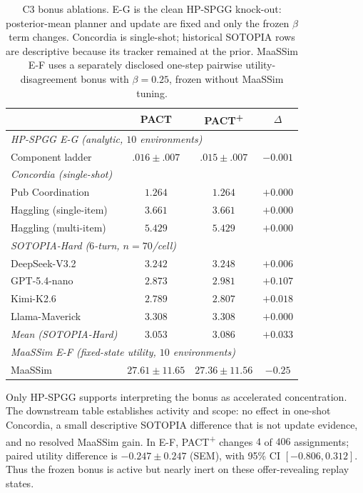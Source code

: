 \begin{table}[t]
\centering\scriptsize
\caption{C3 bonus ablations. E-G is the clean HP-SPGG knock-out: posterior-mean planner and update are fixed and only the frozen $\beta$ term changes. Concordia is single-shot; historical SOTOPIA rows are descriptive because its tracker remained at the prior. MaaSSim E-F uses a separately disclosed one-step pairwise utility-disagreement bonus with $\beta=0.25$, frozen without MaaSSim tuning.}
\label{tab:bonus-ablation}
\setlength{\tabcolsep}{4pt}
\begin{tabular}{@{}lccc@{}}
\toprule
 & PACT & PACT\textsuperscript{+} & $\Delta$ \\
\midrule
\multicolumn{4}{l}{\emph{HP-SPGG E-G (analytic, $10$ environments)}} \\
Component ladder                  & $.016\pm.007$ & $.015\pm.007$ & $-0.001$ \\
\midrule
\multicolumn{4}{l}{\emph{Concordia (single-shot)}} \\
Pub Coordination               & $1.264$ & $1.264$ & $+0.000$ \\
Haggling (single-item)         & $3.661$ & $3.661$ & $+0.000$ \\
Haggling (multi-item)          & $5.429$ & $5.429$ & $+0.000$ \\
\midrule
\multicolumn{4}{l}{\emph{SOTOPIA-Hard ($6$-turn, $n{=}70$/cell)}} \\
DeepSeek-V3.2                  & $3.242$ & $3.248$ & $+0.006$ \\
GPT-5.4-nano                   & $2.873$ & $2.981$ & $+0.107$ \\
Kimi-K2.6                      & $2.789$ & $2.807$ & $+0.018$ \\
Llama-Maverick                 & $3.308$ & $3.308$ & $+0.000$ \\
\emph{Mean (SOTOPIA-Hard)}     & $3.053$ & $3.086$ & $+0.033$ \\
\midrule
\multicolumn{4}{l}{\emph{MaaSSim E-F (fixed-state utility, $10$ environments)}} \\
MaaSSim                         & $27.61\pm11.65$ & $27.36\pm11.56$ & $-0.25$ \\
\bottomrule
\end{tabular}
\end{table}

Only HP-SPGG supports interpreting the bonus as accelerated concentration. The downstream table establishes activity and scope: no effect in one-shot Concordia, a small descriptive SOTOPIA difference that is not update evidence, and no resolved MaaSSim gain. In E-F, PACT\textsuperscript{+} changes $4$ of $406$ assignments; paired utility difference is $-0.247\pm0.247$ (SEM), with 95\% CI $[-0.806,0.312]$. Thus the frozen bonus is active but nearly inert on these offer-revealing replay states.


